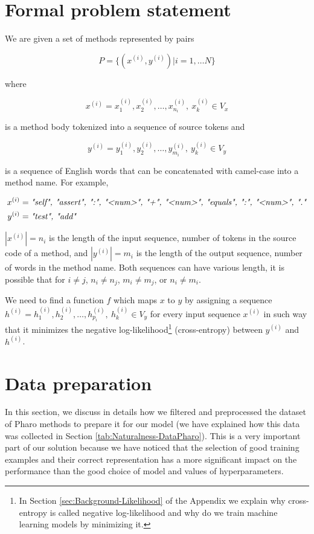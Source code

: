 \section{Formal problem statement}
\label{sec:TranslatingCode-Problem}

We are given a set of methods represented by pairs

\[ P = \{(x^{(i)}, y^{(i)}) | i = 1, \dots N \} \]

where

\[ x^{(i)} = x_1^{(i)}, x_2^{(i)}, \dots, x_{n_i}^{(i)},\ x_k^{(i)} \in V_x \]

is a method body tokenized into a sequence of source tokens and

\[ y^{(i)} = y_1^{(i)}, y_2^{(i)}, \dots, y_{m_i}^{(i)},\ y_k^{(i)} \in V_y \]

is a sequence of English words that can be concatenated with camel-case into a method name. For example,

\begin{align*}
  x^{(i)} &= \text{\textit{"self", "assert", ":", "<num>", "+", "<num>", "equals", ":", "<num>", "."}}\\
  y^{(i)} &= \text{\textit{"test", "add"}}
\end{align*}

$|x^{(i)}| = n_i$ is the length of the input sequence, number of tokens in the source code of a method, and $|y^{(i)}| = m_i$ is the length of the output sequence, number of words in the method name. Both sequences can have various length, it is possible that for $i \neq j$, $n_i \neq n_j$, $m_i \neq m_j$, or $n_i \neq m_i$.

We need to find a function $f$ which maps $x$ to $y$ by assigning a sequence $h^{(i)} = h_1^{(i)}, h_2^{(i)}, \dots, h_{p_i}^{(i)},\ h_k^{(i)} \in V_y$ for every input sequence $x^{(i)}$ in such way that it minimizes the negative log-likelihood\footnote{In Section \ref{sec:Background-Likelihood} of the Appendix we explain why cross-entropy is called negative log-likelihood and why do we train machine learning models by minimizing it.} (cross-entropy) between $y^{(i)}$ and $h^{(i)}$.

\section{Data preparation}
\label{sec:TranslatingCode-Data}

In this section, we discuss in details how we filtered and preprocessed the dataset of Pharo methods to prepare it for our model (we have explained how this data was collected in Section \ref{tab:Naturalness-DataPharo}). This is a very important part of our solution because we have noticed that the selection of good training examples and their correct representation has a more significant impact on the performance than the good choice of model and values of hyperparameters.

